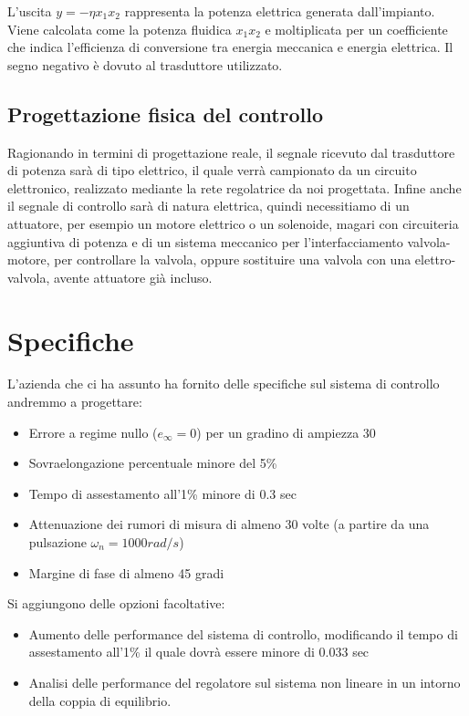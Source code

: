 \documentclass{article}
\begin{document}
L'uscita $y=-\eta x_1 x_2$ rappresenta la potenza elettrica generata dall'impianto. Viene calcolata come la potenza fluidica $x_1 x_2$ e moltiplicata per un coefficiente che indica l'efficienza di conversione tra energia meccanica e energia elettrica. Il segno negativo è dovuto al trasduttore utilizzato.


\subsection{Progettazione fisica del controllo}

Ragionando in termini di progettazione reale, il segnale ricevuto dal trasduttore di potenza sarà di tipo elettrico, il quale verrà campionato da un circuito elettronico, realizzato mediante la rete regolatrice da noi progettata. 
Infine anche il segnale di controllo sarà di natura elettrica, quindi necessitiamo di un attuatore, per esempio un motore elettrico o un solenoide, magari con circuiteria aggiuntiva di potenza e di un sistema meccanico per l'interfacciamento valvola-motore, per controllare la valvola, oppure sostituire una valvola con una elettro-valvola, avente attuatore già incluso.

\section{Specifiche}

L'azienda che ci ha assunto ha fornito delle specifiche sul sistema di controllo andremmo a progettare:

\begin{itemize}
    \item Errore a regime nullo ($e_{\infty}=0$) per un gradino di ampiezza 30
    \item Sovraelongazione percentuale minore del 5\%
    \item Tempo di assestamento all'1\% minore di 0.3 sec
    \item Attenuazione dei rumori di misura di almeno 30 volte (a partire da una pulsazione $\omega_n=1000 rad/s$)
    \item Margine di fase di almeno 45 gradi
\end{itemize}

Si aggiungono delle opzioni facoltative:
\begin{itemize}
    \item Aumento delle performance del sistema di controllo, modificando il tempo di assestamento all'1\% il quale dovrà essere minore di 0.033 sec
    \item Analisi delle performance del regolatore sul sistema non lineare in un intorno della coppia di equilibrio.
\end{itemize}
\end{document}
